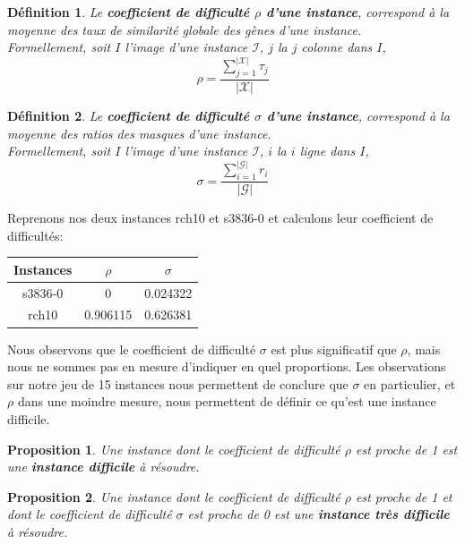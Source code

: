 \documentclass[a4paper,12pt]{article}
\newtheorem{definition}{Définition}
\newtheorem{proposition}{Proposition}
\begin{document}
\begin{definition}
Le \textbf{coefficient de difficulté $\rho$ d'une instance}, correspond à la moyenne des taux de similarité globale des gènes d'une instance.\\
Formellement, soit $I$ l'image d'une instance $\mathcal{I}$, $j$ la $j$ colonne dans $I$,
$$ \rho=\frac{\sum_{j=1}^{|\mathcal{X}|}\tau_j}{|\mathcal{X}|} $$
\end{definition}

\begin{definition}
Le \textbf{coefficient de difficulté $\sigma$ d'une instance}, correspond à la moyenne des ratios des masques d'une instance.\\
Formellement, soit $I$ l'image d'une instance $\mathcal{I}$, $i$ la $i$ ligne dans $I$,
$$ \sigma=\frac{\sum_{i=1}^{|\mathcal{G}|}r_i} {|\mathcal{G}|} $$
\end{definition}

Reprenons nos deux instances rch10 et s3836-0 et calculons leur coefficient de difficultés:

\begin{center}
\begin{tabular}{|c|c|c|}
\hline 
Instances & $\rho$ & $\sigma$ \\ 
\hline 
s3836-0 & 0 & 0.024322 \\ 
\hline
rch10 & 0.906115 & 0.626381 \\ 
\hline
\end{tabular} 
\end{center}

Nous observons que le coefficient de difficulté $\sigma$ est plus significatif que $\rho$, mais nous ne sommes pas en mesure d'indiquer en quel proportions. Les observations sur notre jeu de 15 instances nous permettent de conclure que $\sigma$ en particulier, et $\rho$ dans une moindre mesure, nous permettent de définir ce qu'est une instance difficile. 

\begin{proposition}
Une instance dont le coefficient de difficulté $\rho$ est proche de 1 est une \textbf{instance difficile} à résoudre.
\end{proposition}

\begin{proposition}
Une instance dont le coefficient de difficulté $\rho$ est proche de 1 et dont le coefficient de difficulté $\sigma$ est proche de 0 est une \textbf{instance très difficile} à résoudre.
\end{proposition}
\end{document}
